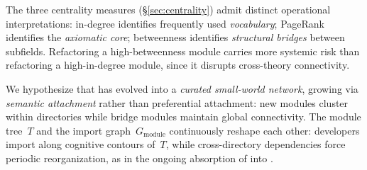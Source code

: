 The three centrality measures (\S\ref{sec:centrality}) admit distinct operational interpretations: in-degree identifies frequently used \textit{vocabulary}; PageRank identifies the \textit{axiomatic core}; betweenness identifies \textit{structural bridges} between subfields. Refactoring a high-betweenness module carries more systemic risk than refactoring a high-in-degree module, since it disrupts cross-theory connectivity.

We hypothesize that  has evolved into a \textit{curated small-world network}, growing via \textit{semantic attachment} rather than preferential attachment: new modules cluster within directories while bridge modules maintain global connectivity. The module tree~$T$ and the import graph~$G_{\mathrm{module}}$ continuously reshape each other: developers import along cognitive contours of~$T$, while cross-directory dependencies force periodic reorganization, as in the ongoing absorption of  into .
